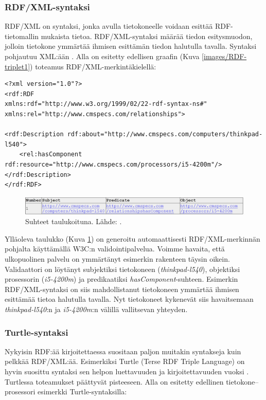\documentclass[finnish, 12pt, a4paper, elec, utf8, pdfa, online]{aaltothesis}
\begin{document}
\subsubsection{RDF/XML-syntaksi}
RDF/XML on syntaksi, jonka avulla tietokoneelle voidaan esittää RDF-tietomallin mukaista tietoa. RDF/XML-syntaksi määrää tiedon esitysmuodon, jolloin tietokone ymmärtää ihmisen esittämän tiedon halutulla tavalla. Syntaksi pohjautuu XML:ään \cite{RDF_XML}. Alla on esitetty edellisen graafin (Kuva \ref{images/RDF-triplet1}) toteamus RDF/XML-merkintäkielellä:

\vskip 0.75cm
\begin{lstlisting}[style=codeblock,caption={RDF/XML syntaksiesimerkki.},captionpos=b,label={rdf_esim}]
<?xml version="1.0"?>
<rdf:RDF
xmlns:rdf="http://www.w3.org/1999/02/22-rdf-syntax-ns#"
xmlns:rel="http://www.cmspecs.com/relationships">

<rdf:Description rdf:about="http://www.cmspecs.com/computers/thinkpad-l540">
    <rel:hasComponent rdf:resource="http://www.cmspecs.com/processors/i5-4200m"/>
</rdf:Description>
</rdf:RDF>
\end{lstlisting}
\vskip 0.75cm

\begin{figure}[htb]
\centering
\includegraphics[width=15cm]{images/RDF-valid.PNG}
\caption{Suhteet taulukoituna. Lähde: \cite{W3C_RDF_validator}. \label{images/RDF-valid}}
\end{figure}

Ylläoleva taulukko (Kuva \ref{images/RDF-valid}) on generoitu automaattisesti RDF/XML-merkinnän pohjalta käyttämällä W3C:n validointipalvelua. Voimme havaita, että ulkopuolinen palvelu on ymmärtänyt esimerkin rakenteen täysin oikein. Validaattori on löytänyt subjektiksi tietokoneen (\textit{thinkpad-l540}), objektiksi prosessorin (\textit{i5-4200m}) ja predikaatiksi \textit{hasComponent}-suhteen. Esimerkin RDF/XML-syntaksi on siis mahdollistanut tietokoneen ymmärtää ihmisen esittämää tietoa halutulla tavalla. Nyt tietokoneet kykenevät siis havaitsemaan \textit{thinkpad-l540}:n ja \textit{i5-4200m}:n välillä vallitsevan yhteyden.


\subsubsection{Turtle-syntaksi}
Nykyisin RDF:ää kirjoitettaessa suositaan paljon muitakin syntakseja kuin pelkkää RDF/XML:ää. Esimerkiksi Turtle (Terse RDF Triple Language) on hyvin suosittu syntaksi sen helpon luettavuuden ja kirjoitettavuuden vuoksi \cite{cambridge2}. Turtlessa toteamukset päättyvät pisteeseen. Alla on esitetty edellinen tietokone--prosessori esimerkki Turtle-syntaksilla:
\end{document}
